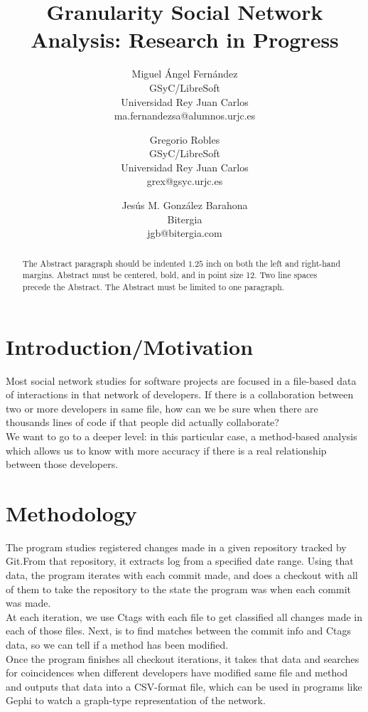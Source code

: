 \documentclass[a4paper]{article}
\title{Granularity Social Network Analysis: Research in Progress}
\author{
Miguel Ángel Fernández \\ GSyC/LibreSoft \\
                Universidad Rey Juan Carlos \\ ma.fernandezsa@alumnos.urjc.es
\and
Gregorio Robles \\ GSyC/LibreSoft \\
                Universidad Rey Juan Carlos \\ grex@gsyc.urjc.es
\and
Jesús M. González Barahona \\ Bitergia \\
                jgb@bitergia.com
}
\begin{document}
\maketitle

\begin{abstract}
The Abstract paragraph should be indented $1.25$ inch on both
the left and right-hand margins. Abstract must be centered, bold, and
in point size 12. Two line spaces precede the Abstract. The Abstract
must be limited to one paragraph.
\end{abstract}
\vskip 32pt


\section{Introduction/Motivation}

Most social network studies for software projects are focused in a file-based
data of interactions in that network of developers. If there is a
collaboration between two or more developers in same file, how can we be sure
when there are thousands lines of code if that people did actually
collaborate? \\
We want to go to a deeper level: in this particular case, a method-based
analysis which allows us to know with more accuracy if there is a real
relationship between those developers.

\section{Methodology}

The program studies registered changes made in a given repository tracked by
Git.From that repository, it extracts log from a specified date range. Using
that data, the program iterates with each commit made, and does a checkout
with all of them to take the repository to the state the program was when each
commit was made. \\ At each iteration, we use Ctags with each file to get
classified all changes made in each of those files. Next, is to find matches
between the commit info and Ctags data, so we can tell if a method has been
modified.\\
Once the program finishes all checkout iterations, it takes that data and
searches for coincidences when different developers have modified same file
and method and outputs that data into a CSV-format file, which can be used in
programs like Gephi to watch a graph-type representation of the network.
\end{document}
